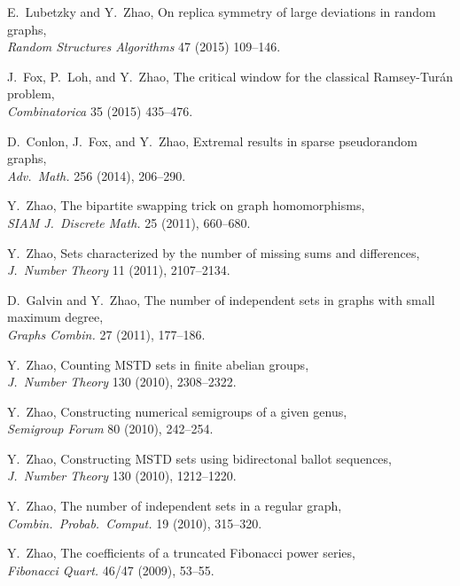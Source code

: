\documentclass[11pt]{amsart}
\newcommand{\arXiv}[1]{\href{http://arxiv.org/abs/#1}{\tt arXiv:#1}}
\renewcommand{\j}[1]{{\frenchspacing\itshape #1}}
\begin{document}
\begin{etaremune}[leftmargin=0.3in,itemsep=4pt,topsep=0pt,partopsep=0pt,parsep=0pt]
\item E.~Lubetzky and Y.~Zhao,
  On replica symmetry of large deviations in random graphs, \\
  \j{Random Structures Algorithms} 47 (2015) 109--146. %

\item J.~Fox, P.~Loh, and Y.~Zhao,
  The critical window for the classical Ramsey-Tur\'an problem, \\
  \j{Combinatorica} 35 (2015) 435--476. %

\item D.~Conlon, J.~Fox, and Y.~Zhao,
  Extremal results in sparse pseudorandom graphs, \\
  \j{Adv.~Math.} {256} (2014), 206--290.

\item Y.~Zhao,
  {The bipartite swapping trick on graph homomorphisms}, \\
  \j{SIAM J.~Discrete Math.} 25 (2011), 660--680.

\item Y.~Zhao,
  {Sets characterized by the number of missing sums and differences}, \\
  \j{J.~Number Theory} 11 (2011), 2107--2134.

\item D.~Galvin and Y.~Zhao,
  {The number of independent sets in graphs with small maximum degree}, \\
  \j{Graphs Combin.} 27 (2011), 177--186.

\item Y.~Zhao,
  {Counting MSTD sets in finite abelian groups}, \\
  \j{J.~Number Theory} {130} (2010), 2308--2322.

\item Y.~Zhao,
  {Constructing numerical semigroups of a given genus},\\
  \j{Semigroup Forum} {80} (2010), 242--254.
\item Y.~Zhao,
  {Constructing MSTD sets using bidirectonal ballot sequences},\\
  \j{J.~Number Theory} {130} (2010), 1212--1220.

\item Y.~Zhao,
  {The number of independent sets in a regular graph}, \\
  \j{Combin.~Probab.~Comput.} {19} (2010), 315--320.

\item Y.~Zhao,
  {The coefficients of a truncated Fibonacci power series}, \\
  \j{Fibonacci Quart.} {46/47} (2009), 53--55.
  
\end{etaremune}
\end{document}

